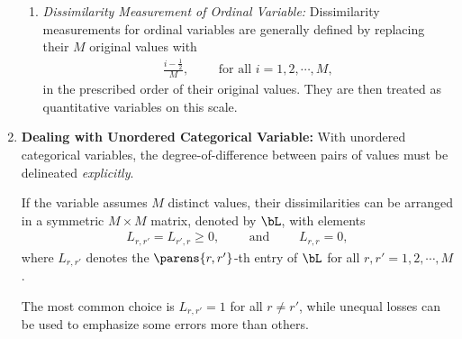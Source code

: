 \documentclass[12pt]{article}
\begin{document}
\begin{enumerate}[label=\textbf{\arabic*.}]
\begin{enumerate}
		\item \textit{Dissimilarity Measurement of Ordinal Variable:} Dissimilarity measurements for ordinal variables are generally defined by replacing their $M$ original values with 
		\begin{align*}
			\frac{i - \frac{1}{2}}{M}, \qquad \text{ for all } i = 1, 2, \cdots, M, 
		\end{align*}
		in the prescribed order of their original values. They are then treated as quantitative variables on this scale. 
	\end{enumerate}
	
	\item \textbf{Dealing with Unordered Categorical Variable:} With unordered categorical variables, the degree-of-difference between pairs of values must be delineated \emph{explicitly}. 
	
	If the variable assumes $M$ distinct values, their dissimilarities can be arranged in a symmetric $M \times M$ matrix, denoted by $\bL$, with elements 
	\begin{align*}
		L_{r, r'} = L_{r', r} \ge 0, \qquad \text{ and } \qquad L_{r,r} = 0, 
	\end{align*}
	where $L_{r, r'}$ denotes the $\parens{r, r'}$-th entry of $\bL$ for all $r, r' = 1, 2, \cdots, M$. 
	
	The most common choice is $L_{r,r'} = 1$ for all $r \neq r'$, while unequal losses can be used to emphasize some errors more than others. 
	

\end{enumerate}
\end{document}
